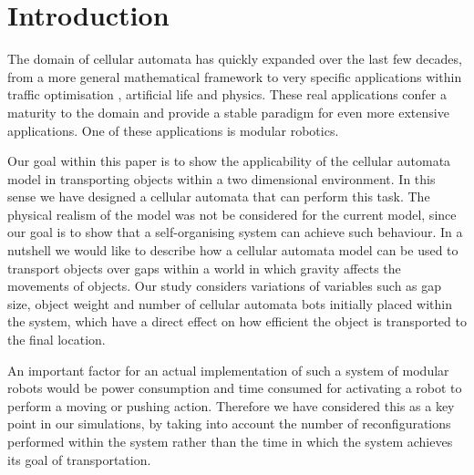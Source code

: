 \section{Introduction}
\label{sec:intro}

The domain of cellular automata has quickly expanded over the last few decades, from a more general mathematical framework \cite{Neumann:1966:TSA:1102024} to very specific applications within traffic optimisation \cite{ISI:A1995QH06900031,ISI:A1992KF03100005}, artificial life \cite{ISI:A1992JV77700063} and physics. These real applications confer a maturity to the domain and provide a stable paradigm for even more extensive applications. One of these applications is modular robotics.

Our goal within this paper is to show the applicability of the cellular automata model in transporting objects within a two dimensional environment. In this sense we have designed a cellular automata that can perform this task. The physical realism of the model was not be considered for the current model, since our goal is to show that a self-organising system can achieve such behaviour. In a nutshell we would like to describe how a cellular automata model can be used to transport objects over gaps within a world in which gravity affects the movements of objects. Our study considers variations of variables such as gap size, object weight and number of cellular automata bots initially placed within the system, which have a direct effect on how efficient the object is transported to the final location. 

An important factor for an actual implementation of such a system of modular robots would be power consumption and time consumed for activating a robot to perform a moving or pushing action. Therefore we have considered this as a key point in our simulations, by taking into account the number of reconfigurations performed within the system rather than the time in which the system achieves its goal of transportation. 
